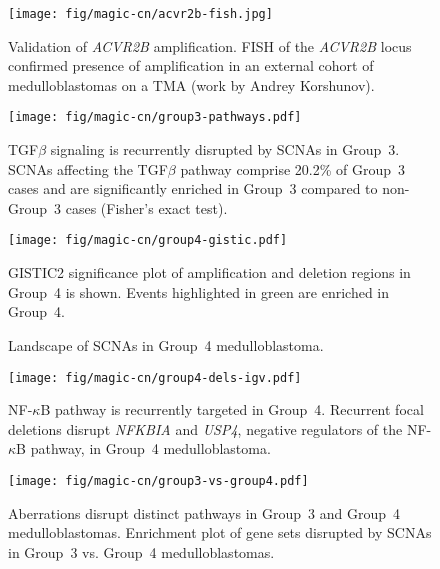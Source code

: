 \documentclass[11pt,letterpaper]{article}
\theoremstyle{definition}
\begin{document}
\begin{SCfigure}[3.0]
	\centering
	\texttt{[image: fig/magic-cn/acvr2b-fish.jpg]}
	\caption{Validation of \emph{ACVR2B} amplification.
	FISH of the \emph{ACVR2B} locus confirmed presence of amplification in an external cohort of medulloblastomas on a TMA (work by Andrey Korshunov).}
	\label{fig:acvr2b-fish}
\end{SCfigure}

\begin{SCfigure}
	\centering
	\texttt{[image: fig/magic-cn/group3-pathways.pdf]}
	\caption{TGF$\beta$ signaling is recurrently disrupted by SCNAs in Group~3.
SCNAs affecting the TGF$\beta$ pathway comprise 20.2\% of Group~3 cases and are significantly enriched in Group~3 compared to non-Group~3 cases (Fisher’s exact test).}
	\label{fig:group3-pathways}
\end{SCfigure}

\clearpage

\begin{figure}[h]
	\begin{center}
		\texttt{[image: fig/magic-cn/group4-gistic.pdf]}
	\end{center}
	\caption{Landscape of SCNAs in Group~4 medulloblastoma.}
	GISTIC2 significance plot of amplification and deletion regions in Group~4 is shown. Events highlighted in green are enriched in Group~4.
	\label{fig:group4-gistic}
\end{figure}

\clearpage

\begin{SCfigure}[2.0]
	\centering
	\texttt{[image: fig/magic-cn/group4-dels-igv.pdf]}
	\caption{NF-$\kappa$B pathway is recurrently targeted in Group~4.
		Recurrent focal deletions disrupt \emph{NFKBIA} and \emph{USP4}, negative regulators of the NF-$\kappa$B pathway, in Group~4 medulloblastoma.}
	\label{fig:group4-dels-igv}
\end{SCfigure}

\begin{SCfigure}
	\centering
	\texttt{[image: fig/magic-cn/group3-vs-group4.pdf]}
	\caption{Aberrations disrupt distinct pathways in Group~3 and Group~4 medulloblastomas.
	Enrichment plot of gene sets disrupted by SCNAs in Group~3 vs. Group~4 medulloblastomas.}
	\label{fig:group3-vs-group4}
\end{SCfigure}

\clearpage
\end{document}

